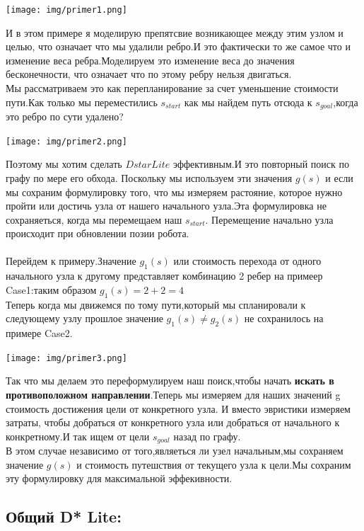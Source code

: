\documentclass[12pt]{article}
\begin{document}
\begin{center}
        \texttt{[image: img/primer1.png]}
\end{center}
И в этом примере я моделирую препятсвие возникающее между этим узлом и целью, что означает что мы удалили ребро.И это фактически то же самое что и изменение веса ребра.Моделируем это изменение веса до значения  бесконечности, что означает что по этому ребру нельзя двигаться.\\
Мы рассматриваем это как перепланирование за счет уменьшение стоимости пути.Как только мы переместились $ s_{start}$ как мы найдем путь отсюда к $ s_{goal}$,когда это ребро по сути удалено?
\begin{center}
        \texttt{[image: img/primer2.png]}
\end{center}
Поэтому мы хотим сделать $D star Lite$ эффективным.И это повторный поиск по графу по мере его обхода. Поскольку мы используем эти значения $g(s)$ и если мы сохраним формулировку того, что мы измеряем растояние, которое нужно пройти или достичь узла от нашего начального узла.Эта формулировка не сохраняеться, когда мы перемещаем наш $ s_{start}$. Перемещение начально узла происходит при обновлении позии робота. \\
\\
Перейдем к примеру.Значение $g_1(s)$ или стоимость перехода от одного начального узла к другому  представляет комбинацию 2 ребер на примеер Case1:таким образом $g_1(s)=2+2=4$\\Теперь когда мы движемся по тому пути,который мы спланировали к следующему узлу прошлое значение $g_1(s)\neq g_2(s)$ не сохранилось  на примере Case2.
\begin{center}
        \texttt{[image: img/primer3.png]}
\end{center}
Так что мы делаем это переформулируем наш поиск,чтобы начать \textbf{искать в противоположном направлении}.Теперь мы измеряем для наших значений g стоимость достижения цели от конкретного узла. И вместо эвристики измеряем затраты, чтобы добраться от конкретного узла или добраться от начального к конкретному.И так ищем от цели $ s_{goal}$ назад по графу. \\
В этом случае независимо от того,являеться ли узел начальным,мы сохраняем значение $g(s)$ и стоимость путешствия от текущего узла к цели.Мы сохраним эту формулировку для максимальной эффекивности.
\hypertarget{b4}{\subsection*{Общий D* Lite:}}
\end{document}
